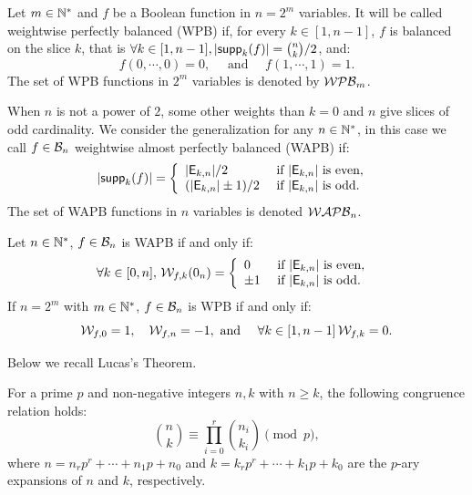 \documentclass[11pt]{llncs}
\begin{document}
\begin{definition}\label{def:WPB}
	Let $m\in \mathbb{N}^*$ and $f$ be a Boolean function in $n=2^m$ variables. It will be called weightwise perfectly balanced (WPB) if, for every $k\in[1,n-1]$, $f$ is balanced on the slice $k$, that is $\forall k \in [1,n-1], |\mathsf{supp}_{k}(f)|=\binom{n}{k}/2$, and:
	\[f(0,\cdots,0)=0,\quad \text{ and } \quad f(1,\cdots,1)=1.\]
	The set of WPB functions in $2^m$ variables is denoted by $\mathcal{WPB}_{m}$.

	When $n$ is not a power of $2$, some other weights than $k=0$ and $n$ give slices of odd cardinality. We consider the generalization for any $n\in \mathbb{N}^*$, in this case we call $f\in \mathcal{B}_{n}$ weightwise almost perfectly balanced (WAPB) if:
	\[|\mathsf{supp}_{k}(f)|= \left \{
	\begin{array}{l l}
	|\mathsf{E}_{k,n}|/2  & \text{ if } |\mathsf{E}_{k,n}| \text{ is even, } \\
	(|\mathsf{E}_{k,n}|\pm 1)/2  & \text{ if }  |\mathsf{E}_{k,n}| \text{ is odd.}
	\end{array}\right.\]
	The set of WAPB functions in $n$ variables is denoted $\mathcal{WAPB}_{n}$.

\end{definition}




\begin{Prop}\label{prop:WAPBWalsh}

	Let $n\in \mathbb{N}^*$, $f\in \mathcal{B}_{n}$ is WAPB if and only if:
	\[\forall k \in [0,n], \, \mathcal{W}_{f,k}(0_n)=
	\left \{
	\begin{array}{l l}
	0  & \text{ if } |\mathsf{E}_{k,n}| \text{ is even, } \\
	\pm 1 & \text{ if }  |\mathsf{E}_{k,n}| \text{ is odd.}
	\end{array}\right. \]
	If $n=2^m$ with $m\in \mathbb{N}^*$, $f\in \mathcal{B}_{n}$ is WPB if and only if:
	\[\mathcal{W}_{f,0}=1, \quad \mathcal{W}_{f,n}=-1, \text{ and } \quad \forall k \in [1,n-1] \,  \mathcal{W}_{f,k}=0. \]

\end{Prop}

Below we recall Lucas's Theorem.

\begin{lemma}For a prime \( p \) and non-negative integers $n, k $ with $n \geq k $, the following congruence relation holds:
	\[
	\binom{n}{k} \equiv \prod_{i=0}^{r} \binom{n_i}{k_i} \pmod{p},
	\]
	where
	$
	n = n_r p^r + \cdots + n_1 p + n_0
	$ and
	$
	k = k_r p^r + \cdots + k_1 p + k_0
	$
	are the \( p \)-ary expansions of \( n\) and \( k \), respectively.
\end{lemma}
\end{document}
